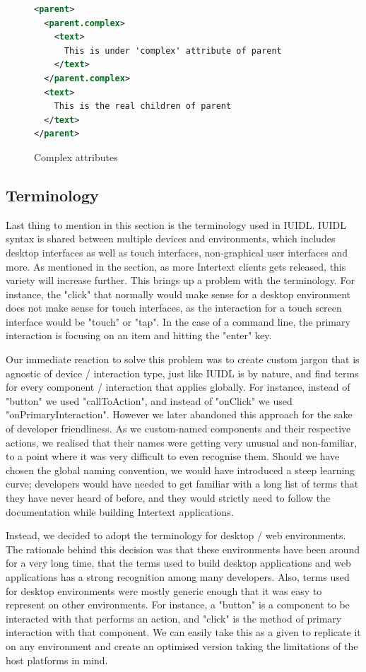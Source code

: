 \begin{figure}
\begin{minipage}{\linewidth}
\begin{lstlisting}[language=xml]
<parent>
  <parent.complex>
    <text>
      This is under 'complex' attribute of parent
    </text>
  </parent.complex>
  <text>
    This is the real children of parent
  </text>
</parent>
\end{lstlisting}
\end{minipage}
\caption{Complex attributes}%
\label{fig:complex_attributes}%
\end{figure}


\subsection{Terminology}

Last thing to mention in this section is the terminology used in IUIDL. IUIDL syntax is shared between multiple devices and environments, which includes desktop interfaces as well as touch interfaces, non-graphical user interfaces and more. As mentioned in the  section, as more Intertext clients gets released, this variety will increase further. This brings up a problem with the terminology. For instance, the "click" that normally would make sense for a desktop environment does not make sense for touch interfaces, as the interaction for a touch screen interface would be "touch" or "tap". In the case of a command line, the primary interaction is focusing on an item and hitting the "enter" key. 

Our immediate reaction to solve this problem was to create custom jargon that is agnostic of device / interaction type, just like IUIDL is by nature, and find terms for every component / interaction that applies globally. For instance, instead of "button" we used "callToAction", and instead of "onClick" we used "onPrimaryInteraction". However we later abandoned this approach for the sake of developer friendliness. As we custom-named components and their respective actions, we realised that their names were getting very unusual and non-familiar, to a point where it was very difficult to even recognise them. Should we have chosen the global naming convention, we would have introduced a steep learning curve; developers would have needed to get familiar with a long list of terms that they have never heard of before, and they would strictly need to follow the documentation while building Intertext applications.

Instead, we decided to adopt the terminology for desktop / web environments. The rationale behind this decision was that these environments have been around for a very long time, that the terms used to build desktop applications and web applications has a strong recognition among many developers. Also, terms used for desktop environments were mostly generic enough that it was easy to represent on other environments. For instance, a "button" is a component to be interacted with that performs an action, and "click" is the method of primary interaction with that component. We can easily take this as a given to replicate it on any environment and create an optimised version taking the limitations of the host platforms in mind.